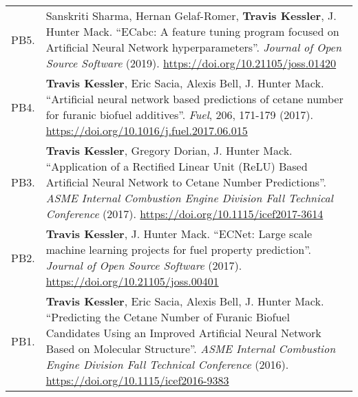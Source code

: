 \documentclass{letter}
\begin{document}
\begin{tabular*}{\linewidth}{p{0.08\linewidth} p{0.92\linewidth}}
        PB5. & Sanskriti Sharma, Hernan Gelaf-Romer, \textbf{Travis Kessler}, J. Hunter Mack. “ECabc: A feature tuning program focused on Artificial Neural Network hyperparameters”. \textit{Journal of Open Source Software} (2019). \url{https://doi.org/10.21105/joss.01420} \\
        PB4. & \textbf{Travis Kessler}, Eric Sacia, Alexis Bell, J. Hunter Mack. “Artificial neural network based predictions of cetane number for furanic biofuel additives”. \textit{Fuel}, 206, 171-179 (2017). \url{https://doi.org/10.1016/j.fuel.2017.06.015} \\
        PB3. & \textbf{Travis Kessler}, Gregory Dorian, J. Hunter Mack. “Application of a Rectified Linear Unit (ReLU) Based Artificial Neural Network to Cetane Number Predictions”. \textit{ASME Internal Combustion Engine Division Fall Technical Conference} (2017). \url{https://doi.org/10.1115/icef2017-3614} \\
        PB2. & \textbf{Travis Kessler}, J. Hunter Mack. “ECNet: Large scale machine learning projects for fuel property prediction”. \textit{Journal of Open Source Software} (2017). \url{https://doi.org/10.21105/joss.00401} \\
        PB1. & \textbf{Travis Kessler}, Eric Sacia, Alexis Bell, J. Hunter Mack. “Predicting the Cetane Number of Furanic Biofuel Candidates Using an Improved Artificial Neural Network Based on Molecular Structure”. \textit{ASME Internal Combustion Engine Division Fall Technical Conference} (2016). \url{https://doi.org/10.1115/icef2016-9383}
    \end{tabular*}
\end{document}
